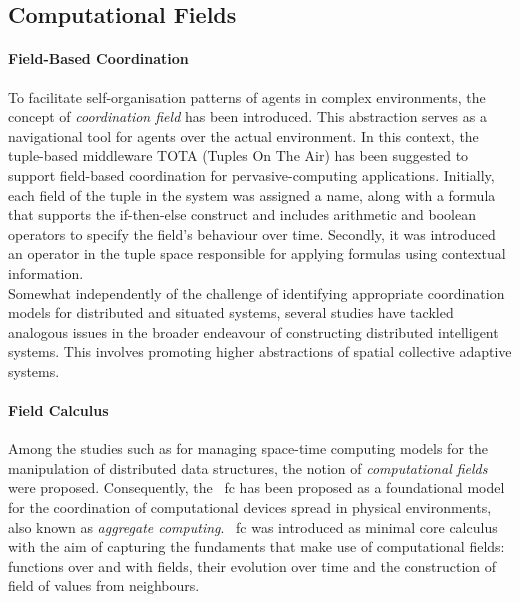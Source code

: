 \subsection{Computational Fields}
\label{subsec:computational-fields}

\paragraph{Field-Based Coordination}
To facilitate self-organisation patterns of agents in complex environments, the concept of \emph{coordination field}
has been introduced.
This abstraction serves as a navigational tool for agents over the actual environment.
In this context, the tuple-based middleware TOTA (Tuples On The Air) has been suggested to support field-based
coordination for pervasive-computing applications.
Initially, each field of the tuple in the system was assigned a name, along with a formula that supports the
if-then-else construct and includes arithmetic and boolean operators to specify the field's behaviour over time.
Secondly, it was introduced an operator in the tuple space responsible for applying formulas using contextual information.\\
Somewhat independently of the challenge of identifying appropriate coordination models for distributed and situated systems,
several studies have tackled analogous issues in the broader endeavour of constructing distributed intelligent systems.
This involves promoting higher abstractions of spatial collective adaptive systems.

\paragraph{Field Calculus}
Among the studies such as for managing space-time computing models for the manipulation of distributed data structures,
the notion of \emph{computational fields} were proposed.
Consequently, the ~\ac{fc} has been proposed as a foundational model for the coordination of computational
devices spread in physical environments, also known as \emph{aggregate computing}.
~\ac{fc} was introduced as minimal core calculus with the aim of capturing the fundaments that make use of computational
fields: functions over and with fields, their evolution over time and the construction of field of values from neighbours.

